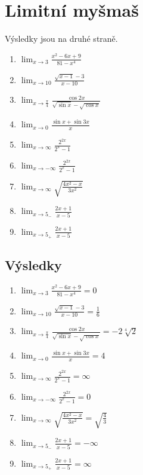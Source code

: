 \documentclass[12pt,a4paper]{article}
\begin{document}
\section*{Limitní myšmaš}

Výsledky jsou na druhé straně.

\begin{enumerate}
	\everymath{\displaystyle}
	\parskip\bigskipamount
	\item $\lim_{x \to 3}\frac{x^2 - 6x + 9}{81 - x^4}$
	\item $\lim_{x \to 10}\frac{\sqrt{x-1}-3}{x-10}$
	\item $\lim_{x \to \frac\pi4} \frac{\cos 2x}{\sqrt{\sin x} - \sqrt{\cos x}}$
	\item $\lim_{x \to 0} \frac{\sin x + \sin 3x}{x}$
	\item $\lim_{x \to \infty} \frac{2^{2x}}{2^x - 1}$
	\item $\lim_{x \to -\infty} \frac{2^{2x}}{2^x - 1}$
	\item $\lim_{x \to \infty} \sqrt{\frac{4x^2 - x}{3x^2}}$
	\item $\lim_{x \to 5_-} \frac{2x+1}{x-5}$
	\item $\lim_{x \to 5_+} \frac{2x+1}{x-5}$
\end{enumerate}

\newpage

\subsection*{Výsledky}

\begin{enumerate}
	\everymath{\displaystyle}
	\parskip\bigskipamount
	\item $\lim_{x \to 3}\frac{x^2 - 6x + 9}{81 - x^4} = 0$
	\item $\lim_{x \to 10}\frac{\sqrt{x-1}-3}{x-10} = \frac16$
	\item $\lim_{x \to \frac\pi4} \frac{\cos 2x}{\sqrt{\sin x} - \sqrt{\cos x}} = -2\sqrt[4]2$
	\item $\lim_{x \to 0} \frac{\sin x + \sin 3x}{x} = 4$
	\item $\lim_{x \to \infty} \frac{2^{2x}}{2^x - 1} = \infty$
	\item $\lim_{x \to -\infty} \frac{2^{2x}}{2^x - 1} = 0$
	\item $\lim_{x \to \infty} \sqrt{\frac{4x^2 - x}{3x^2}} = \sqrt{\frac43}$
	\item $\lim_{x \to 5_-} \frac{2x+1}{x-5} = -\infty$
	\item $\lim_{x \to 5_+} \frac{2x+1}{x-5} = \infty$
\end{enumerate}
\end{document}
